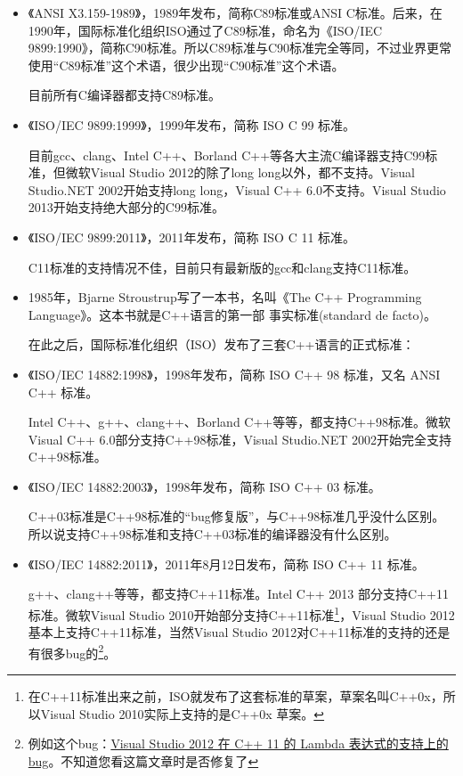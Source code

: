 \documentclass[11pt,twoside,a4paper,titlepage]{article}	%
\newcommand{\kw}[1]{\textcolor[rgb]{0.0,0.0,0.63}{ #1}}
\begin{document}
\begin{itemize}
\item 《ANSI X3.159-1989》，1989年发布，简称C89标准或ANSI C标准。后来，在1990年，国际标准化组织ISO通过了C89标准，命名为《ISO/IEC 9899:1990》，简称C90标准。所以C89标准与C90标准完全等同，不过业界更常使用“C89标准”这个术语，很少出现“C90标准”这个术语。

目前所有C编译器都支持C89标准。
\item 《ISO/IEC 9899:1999》，1999年发布，简称 ISO C 99 标准。

目前gcc、clang、Intel C++、Borland C++等各大主流C编译器支持C99标准，但微软Visual Studio 2012的除了long long以外，都不支持。Visual Studio.NET 2002开始支持long long，Visual C++ 6.0不支持。Visual Studio 2013开始支持绝大部分的C99标准。
\item 《ISO/IEC 9899:2011》，2011年发布，简称 ISO C 11 标准。

C11标准的支持情况不佳，目前只有最新版的gcc和clang支持C11标准。

\item 1985年，Bjarne Stroustrup写了一本书，名叫《The C++ Programming Language》。这本书就是C++语言的第一部\kw{事实标准(standard de facto)}。

在此之后，国际标准化组织（ISO）发布了三套C++语言的正式标准：
\item 《ISO/IEC 14882:1998》，1998年发布，简称 ISO C++ 98 标准，又名 ANSI C++ 标准。

Intel C++、g++、clang++、Borland C++等等，都支持C++98标准。微软Visual C++ 6.0部分支持C++98标准，Visual Studio.NET 2002开始完全支持C++98标准。

\item 《ISO/IEC 14882:2003》，1998年发布，简称 ISO C++ 03 标准。

C++03标准是C++98标准的“bug修复版”，与C++98标准几乎没什么区别。所以说支持C++98标准和支持C++03标准的编译器没有什么区别。

\item 《ISO/IEC 14882:2011》，2011年8月12日发布，简称 ISO C++ 11 标准。

g++、clang++等等，都支持C++11标准。Intel C++ 2013 部分支持C++11标准。微软Visual Studio 2010开始部分支持C++11标准\footnote{在C++11标准出来之前，ISO就发布了这套标准的草案，草案名叫C++0x，所以Visual Studio 2010实际上支持的是C++0x 草案。}，Visual Studio 2012基本上支持C++11标准，当然Visual Studio 2012对C++11标准的支持的还是有很多bug的\footnote{例如这个bug：\href{http://connect.microsoft.com/VisualStudio/feedback/details/804635/bug-in-lambda-expression-in-visual-studio-2012-update-3}{Visual Studio 2012 在 C++ 11 的 Lambda 表达式的支持上的bug}。不知道您看这篇文章时是否修复了}。


\end{itemize}
\end{document}
